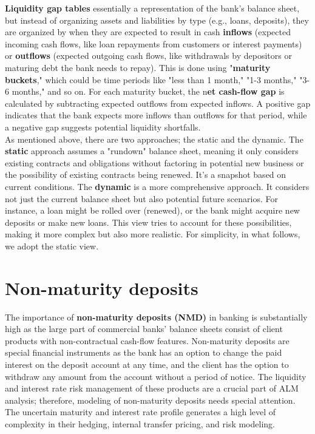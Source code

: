 \documentclass[11pt]{article}
\begin{document}
 \textbf{Liquidity gap tables} essentially a representation of the bank's balance sheet, but instead of organizing assets and liabilities by type (e.g., loans, deposits), they are organized by when they are expected to result in cash \textbf{inflows} (expected incoming cash flows, like loan repayments from customers or interest payments) or \textbf{outflows} (expected outgoing cash flows, like withdrawals by depositors or maturing debt the bank needs to repay). This is done using "\textbf{maturity buckets}," which could be time periods like "less than 1 month," "1-3 months," "3-6 months," and so on. For each maturity bucket, the n\textbf{et cash-flow gap} is calculated by subtracting expected outflows from expected inflows. A positive gap indicates that the bank expects more inflows than outflows for that period, while a negative gap suggests potential liquidity shortfalls.\\
 
As mentioned above, there are two approaches; the static and the dynamic. The \textbf{static} approach assumes a "rundown" balance sheet, meaning it only considers existing contracts and obligations without factoring in potential new business or the possibility of existing contracts being renewed. It's a snapshot based on current conditions.
The \textbf{dynamic} is a more comprehensive approach. It considers not just the current balance sheet but also potential future scenarios. For instance, a loan might be rolled over (renewed), or the bank might acquire new deposits or make new loans. This view tries to account for these possibilities, making it more complex but also more realistic.
For simplicity, in what follows, we adopt the static view.




\section{Non-maturity deposits}

The importance of \textbf{non-maturity deposits (NMD)} in banking is substantially high as the large part of commercial banks' balance sheets consist of client products with non-contractual cash-flow features. Non-maturity deposits are special financial instruments as the bank has an option to change the paid interest on the deposit account at any time, and the client has the option to withdraw any amount from the account without a period of notice. The liquidity and interest rate risk management of these products are a crucial part of ALM analysis; therefore, modeling of non-maturity deposits needs special attention. The uncertain maturity and interest rate profile generates a high level of complexity in their hedging, internal transfer pricing, and risk modeling.
\\
\end{document}
